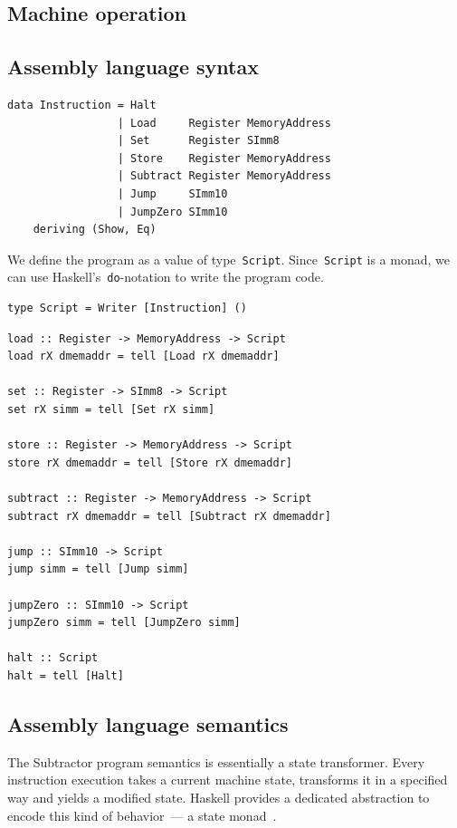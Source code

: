 \subsection{Machine operation}

\subsection{Assembly language syntax}

\begin{verbatim}
data Instruction = Halt
                 | Load     Register MemoryAddress
                 | Set      Register SImm8
                 | Store    Register MemoryAddress
                 | Subtract Register MemoryAddress
                 | Jump     SImm10
                 | JumpZero SImm10
    deriving (Show, Eq)
\end{verbatim}

We define the program as a value of type~\texttt{Script}. Since~\texttt{Script} is a monad, we can use Haskell's~\texttt{do}-notation to write the program code.

\begin{verbatim}
type Script = Writer [Instruction] ()
\end{verbatim}

\begin{verbatim}
load :: Register -> MemoryAddress -> Script
load rX dmemaddr = tell [Load rX dmemaddr]

set :: Register -> SImm8 -> Script
set rX simm = tell [Set rX simm]

store :: Register -> MemoryAddress -> Script
store rX dmemaddr = tell [Store rX dmemaddr]

subtract :: Register -> MemoryAddress -> Script
subtract rX dmemaddr = tell [Subtract rX dmemaddr]

jump :: SImm10 -> Script
jump simm = tell [Jump simm]

jumpZero :: SImm10 -> Script
jumpZero simm = tell [JumpZero simm]

halt :: Script
halt = tell [Halt]
\end{verbatim}

\subsection{Assembly language semantics}

The Subtractor program semantics is essentially a state transformer. Every instruction execution takes a current machine state, transforms it in a specified way and yields a modified state. Haskell provides a dedicated abstraction to encode this kind of behavior~--- a state monad~\cite{stateMonad}.

